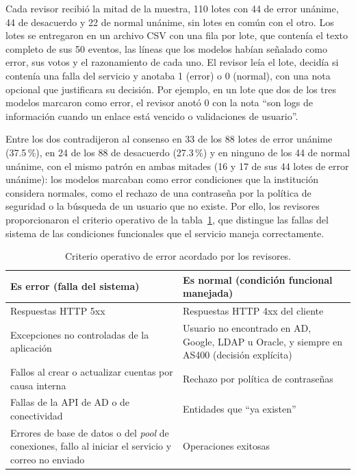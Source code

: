 Cada revisor recibió la mitad de la muestra, 110 lotes con 44 de error unánime, 44 de desacuerdo y 22 de normal unánime, sin lotes en común con el otro. Los lotes se entregaron en un archivo CSV con una fila por lote, que contenía el texto completo de sus 50 eventos, las líneas que los modelos habían señalado como error, sus votos y el razonamiento de cada uno. El revisor leía el lote, decidía si contenía una falla del servicio y anotaba 1 (error) o 0 (normal), con una nota opcional que justificara su decisión. Por ejemplo, en un lote que dos de los tres modelos marcaron como error, el revisor anotó 0 con la nota ``son logs de información cuando un enlace está vencido o validaciones de usuario''.

Entre los dos contradijeron al consenso en 33 de los 88 lotes de error unánime (37.5\,\%), en 24 de los 88 de desacuerdo (27.3\,\%) y en ninguno de los 44 de normal unánime, con el mismo patrón en ambas mitades (16 y 17 de sus 44 lotes de error unánime): los modelos marcaban como error condiciones que la institución considera normales, como el rechazo de una contraseña por la política de seguridad o la búsqueda de un usuario que no existe. Por ello, los revisores proporcionaron el criterio operativo de la tabla~\ref{tab:met_criterio}, que distingue las fallas del sistema de las condiciones funcionales que el servicio maneja correctamente.

\begin{table}[H]
\centering
\caption{Criterio operativo de error acordado por los revisores.}
\label{tab:met_criterio}
\small
\begin{tabular}{@{}p{7.2cm}p{7.2cm}@{}}
\toprule
\textbf{Es error (falla del sistema)} & \textbf{Es normal (condición funcional manejada)} \\
\midrule
Respuestas HTTP 5xx & Respuestas HTTP 4xx del cliente \\
Excepciones no controladas de la aplicación & Usuario no encontrado en AD, Google, LDAP u Oracle, y siempre en AS400 (decisión explícita) \\
Fallos al crear o actualizar cuentas por causa interna & Rechazo por política de contraseñas \\
Fallas de la API de AD o de conectividad & Entidades que ``ya existen'' \\
Errores de base de datos o del \textit{pool} de conexiones, fallo al iniciar el servicio y correo no enviado & Operaciones exitosas \\
\bottomrule
\end{tabular}
\normalsize
\end{table}

